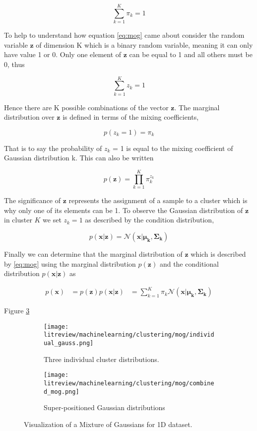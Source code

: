 \[\sum_{k=1}^K\pi_k = 1\]

To help to understand how equation \ref{eq:mog} came about consider the random variable $\boldsymbol{z}$ of dimension K which is a binary random variable, meaning it can only have value 1 or 0. Only one element of $\boldsymbol{z}$ can be equal to 1 and all others must be 0, thus

\[\sum_{k=1}^Kz_k = 1\]

Hence there are K possible combinations of the vector $\boldsymbol{z}$. The marginal distribution over $\boldsymbol{z}$ is defined in terms of the mixing coefficients, 

\[p(z_k = 1) = \pi_k\]

That is to say the probability of $z_k$ = 1 is equal to the mixing coefficient of Gaussian distribution k. This can also be written

\[p(\boldsymbol{z}) = \prod^K_{k=1}\pi^{z_k}_k\]

The significance of $\boldsymbol{z}$ represents the assignment of a sample to a cluster which is why only one of its elements can be 1. To observe the Gaussian distribution of $\boldsymbol{z}$ in cluster $K$ we set $z_k = 1$ as described by the condition distribution,

\[p(\bm{x}|\boldsymbol{z}) = \mathcal{N}(\boldsymbol{x}|\boldsymbol{\mu_k}, \boldsymbol{\Sigma_k}) \]

Finally we can determine that the marginal distribution of $\boldsymbol{z}$ which is described by \ref{eq:mog} using the marginal distribution $p(\boldsymbol{z})$ and the conditional distribution $p(\bm{x}|\bm{z})$ as 

\begin{align}
	p(\bm{x}) 	&= p(\bm{z})p(\bm{x}|\bm{z})
				&= \sum^{K}_{k = 1}\pi_k \mathcal{N}(\boldsymbol{x}|\boldsymbol{\mu_k}, \boldsymbol{\Sigma_k})
\label{eq:mog_derive}
\end{align}

Figure \ref{fig:mog_compare}

\begin{figure}[htbp]
    \centering
     \begin{subfigure}[b]{0.45\textwidth}
        \texttt{[image: litreview/machinelearning/clustering/mog/individual\_gauss.png]}
	\captionsetup{format = hang}
        \caption{Three individual cluster distributions.}
        \label{fig:mog_singles}
    \end{subfigure} 
    \begin{subfigure}[b]{0.45\textwidth}
        \texttt{[image: litreview/machinelearning/clustering/mog/combined\_mog.png]}	
	\captionsetup{format = hang}
        \caption{Super-positioned Gaussian distributions}
        \label{fig:mog_combined}
    \end{subfigure}
    \captionsetup{format = hang}
    \caption{Visualization of a Mixture of Gaussians for 1D dataset.}
    \label{fig:mog_compare}
\end{figure}











